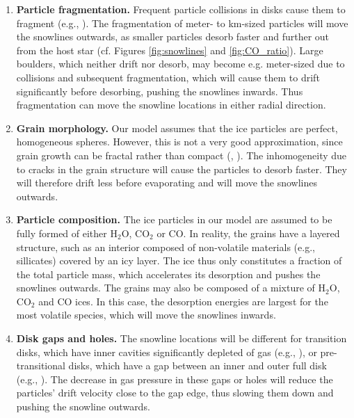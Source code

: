 \documentclass[apj]{emulateapj}
\begin{document}
\begin{enumerate}
\begin{table}[t!]
\begin{center}
\end{center}
\end{table}

\item \textbf{Particle fragmentation.} Frequent particle collisions in disks cause them to fragment (e.g., \citealt{birnstiel12}). The fragmentation of meter- to km-sized particles will move the snowlines outwards, as smaller particles desorb faster and further out from the host star (cf. Figures \ref{fig:snowlines} and \ref{fig:CO_ratio}). Large boulders, which neither drift nor desorb, may become e.g. meter-sized due to collisions and subsequent fragmentation, which will cause them to drift significantly before desorbing, pushing the snowlines inwards. Thus fragmentation can move the snowline locations in either radial direction.

\item \textbf{Grain morphology.} Our model assumes that the ice particles are perfect, homogeneous spheres. However, this is not a very good approximation, since grain growth can be fractal rather than compact (\citealt{zsom10}, \citealt{okuzumi12}). The inhomogeneity due to cracks in the grain structure will cause the particles to desorb faster. They will therefore drift less before evaporating and will move the snowlines outwards.

\item \textbf{Particle composition.} The ice particles in our model are assumed to be fully formed of either H$_2$O, CO$_2$ or CO. In reality, the grains have a layered structure, such as an interior composed of non-volatile materials (e.g., sillicates) covered by an icy layer. The ice thus only constitutes a fraction of the total particle mass, which accelerates its desorption and pushes the snowlines outwards. The grains may also be composed of a mixture of H$_2$O, CO$_2$ and CO ices. In this case, the desorption energies are largest for the most volatile species, which will move the snowlines inwards. 


\item \textbf{Disk gaps and holes.} The snowline locations will be different for transition disks, which have inner cavities significantly depleted of gas (e.g., \citealt{espaillat12}), or pre-transitional disks, which have a gap between an inner and outer full disk (e.g., \citealt{kraus11}). The decrease in gas pressure in these gaps or holes will reduce the particles' drift velocity close to the gap edge, thus slowing them down and pushing the snowline outwards.


\end{enumerate}
\end{document}
